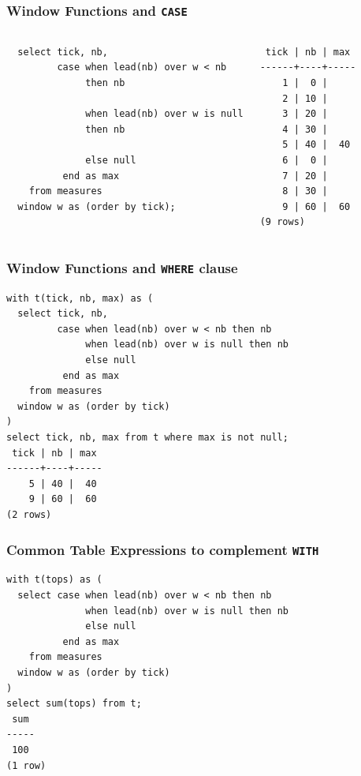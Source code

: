 \documentclass{beamer}
\begin{document}
\begin{frame}[fragile]
  \frametitle{Window Functions and \texttt{CASE}}

\begin{columns}
\begin{verbatim}
  select tick, nb,
         case when lead(nb) over w < nb
              then nb

              when lead(nb) over w is null
              then nb

              else null
          end as max
    from measures
  window w as (order by tick);
\end{verbatim}
\begin{verbatim}
 tick | nb | max 
------+----+-----
    1 |  0 |    
    2 | 10 |    
    3 | 20 |    
    4 | 30 |    
    5 | 40 |  40
    6 |  0 |    
    7 | 20 |    
    8 | 30 |    
    9 | 60 |  60
(9 rows)
\end{verbatim}
\end{columns}
\end{frame}

\begin{frame}[fragile]
  \frametitle{Window Functions and \texttt{WHERE} clause}

\begin{verbatim}
with t(tick, nb, max) as (
  select tick, nb,
         case when lead(nb) over w < nb then nb
              when lead(nb) over w is null then nb
              else null
          end as max
    from measures
  window w as (order by tick)
)
select tick, nb, max from t where max is not null;
 tick | nb | max 
------+----+-----
    5 | 40 |  40
    9 | 60 |  60
(2 rows)
\end{verbatim}
\end{frame}

\begin{frame}[fragile]
  \frametitle{Common Table Expressions to complement \texttt{WITH}}

\begin{verbatim}
with t(tops) as (
  select case when lead(nb) over w < nb then nb
              when lead(nb) over w is null then nb
              else null
          end as max
    from measures
  window w as (order by tick)
)
select sum(tops) from t;
 sum 
-----
 100
(1 row)
\end{verbatim}
\end{frame}
\end{document}
